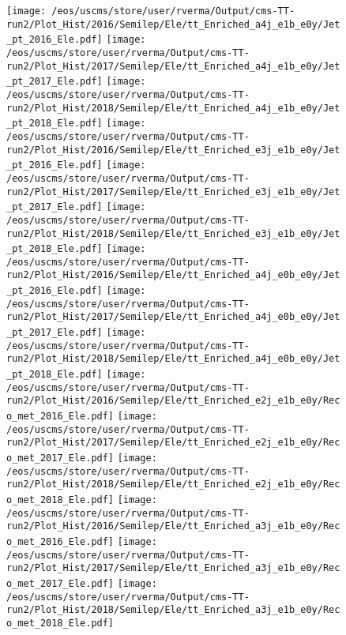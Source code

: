\begin{figure}
\centering
\texttt{[image: /eos/uscms/store/user/rverma/Output/cms-TT-run2/Plot\_Hist/2016/Semilep/Ele/tt\_Enriched\_a4j\_e1b\_e0y/Jet\_pt\_2016\_Ele.pdf]}
\texttt{[image: /eos/uscms/store/user/rverma/Output/cms-TT-run2/Plot\_Hist/2017/Semilep/Ele/tt\_Enriched\_a4j\_e1b\_e0y/Jet\_pt\_2017\_Ele.pdf]}
\texttt{[image: /eos/uscms/store/user/rverma/Output/cms-TT-run2/Plot\_Hist/2018/Semilep/Ele/tt\_Enriched\_a4j\_e1b\_e0y/Jet\_pt\_2018\_Ele.pdf]}
\texttt{[image: /eos/uscms/store/user/rverma/Output/cms-TT-run2/Plot\_Hist/2016/Semilep/Ele/tt\_Enriched\_e3j\_e1b\_e0y/Jet\_pt\_2016\_Ele.pdf]}
\texttt{[image: /eos/uscms/store/user/rverma/Output/cms-TT-run2/Plot\_Hist/2017/Semilep/Ele/tt\_Enriched\_e3j\_e1b\_e0y/Jet\_pt\_2017\_Ele.pdf]}
\texttt{[image: /eos/uscms/store/user/rverma/Output/cms-TT-run2/Plot\_Hist/2018/Semilep/Ele/tt\_Enriched\_e3j\_e1b\_e0y/Jet\_pt\_2018\_Ele.pdf]}
\texttt{[image: /eos/uscms/store/user/rverma/Output/cms-TT-run2/Plot\_Hist/2016/Semilep/Ele/tt\_Enriched\_a4j\_e0b\_e0y/Jet\_pt\_2016\_Ele.pdf]}
\texttt{[image: /eos/uscms/store/user/rverma/Output/cms-TT-run2/Plot\_Hist/2017/Semilep/Ele/tt\_Enriched\_a4j\_e0b\_e0y/Jet\_pt\_2017\_Ele.pdf]}
\texttt{[image: /eos/uscms/store/user/rverma/Output/cms-TT-run2/Plot\_Hist/2018/Semilep/Ele/tt\_Enriched\_a4j\_e0b\_e0y/Jet\_pt\_2018\_Ele.pdf]}
\texttt{[image: /eos/uscms/store/user/rverma/Output/cms-TT-run2/Plot\_Hist/2016/Semilep/Ele/tt\_Enriched\_e2j\_e1b\_e0y/Reco\_met\_2016\_Ele.pdf]}
\texttt{[image: /eos/uscms/store/user/rverma/Output/cms-TT-run2/Plot\_Hist/2017/Semilep/Ele/tt\_Enriched\_e2j\_e1b\_e0y/Reco\_met\_2017\_Ele.pdf]}
\texttt{[image: /eos/uscms/store/user/rverma/Output/cms-TT-run2/Plot\_Hist/2018/Semilep/Ele/tt\_Enriched\_e2j\_e1b\_e0y/Reco\_met\_2018\_Ele.pdf]}
\texttt{[image: /eos/uscms/store/user/rverma/Output/cms-TT-run2/Plot\_Hist/2016/Semilep/Ele/tt\_Enriched\_a3j\_e1b\_e0y/Reco\_met\_2016\_Ele.pdf]}
\texttt{[image: /eos/uscms/store/user/rverma/Output/cms-TT-run2/Plot\_Hist/2017/Semilep/Ele/tt\_Enriched\_a3j\_e1b\_e0y/Reco\_met\_2017\_Ele.pdf]}
\texttt{[image: /eos/uscms/store/user/rverma/Output/cms-TT-run2/Plot\_Hist/2018/Semilep/Ele/tt\_Enriched\_a3j\_e1b\_e0y/Reco\_met\_2018\_Ele.pdf]}
\end{figure}

